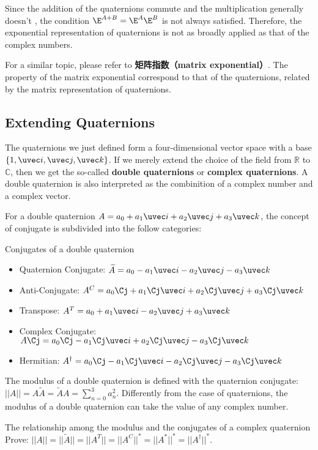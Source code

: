 Since the addition of the quaternions commute and the multiplication generally doesn't , the condition $\E^{A+B} = \E^A \E^B$ is not always satisfied. Therefore, the exponential representation of quaternions is not as broadly applied as that of the complex numbers. 

For a similar topic, please refer to \textbf{矩阵指数（matrix exponential）}. The property of the matrix exponential correspond to that of the quaternions, related by the matrix representation of quaternions. 

\subsection{Extending Quaternions}

The quaternions we just defined form a four-dimensional vector space with a base $\{1, \uvec i, \uvec j, \uvec k\}$. If we merely extend the choice of the field from $\mathbb{R}$ to $\mathbb{C}$, then we get the so-called \textbf{double quaternions} or \textbf{complex quaternions}. A double quaternion is also interpreted as the combinition of a complex number and a complex vector. 

For a double quaternion $A=a_0+a_1 \uvec i+a_2\uvec j+a_3\uvec k$, the concept of conjugate is subdivided into the follow categories: 

\begin{definition}{Conjugates of a double quaternion}
\begin{itemize}
\item Quaternion Conjugate: $\widetilde{A}=a_0-a_1\uvec i-a_2\uvec j-a_3\uvec k$
\item Anti-Conjugate: $A^C=a_0\Cj + a_1\Cj\uvec i+a_2\Cj\uvec j+a_3\Cj\uvec k$
\item Transpose: $A^T=a_0+a_1\uvec i-a_2\uvec j+a_3\uvec k$
\item Complex Conjugate: $A\Cj=a_0\Cj-a_1\Cj\uvec i+a_2\Cj\uvec j-a_3\Cj\uvec k$
\item Hermitian: $A^\dagger=a_0\Cj-a_1\Cj\uvec i-a_2\Cj\uvec j-a_3\Cj\uvec k$
\end{itemize}
\end{definition}

The modulus of a double quaternion is defined with the quaternion conjugate: $||A||=A\widetilde{A}=\widetilde{A}A=\sum^{3}_{n=0}a^2_n$. Differently from the case of quaternions, the modulus of a double quaternion can take the value of any complex number. 

\begin{exercise}{The relationship among the modulus and the conjugates of a complex quaternion}
Prove: $||A||=||\widetilde{A}||=||A^T||=||A^C||^*=||A^*||^*=||A^\dagger||^*$. 
\end{exercise}


